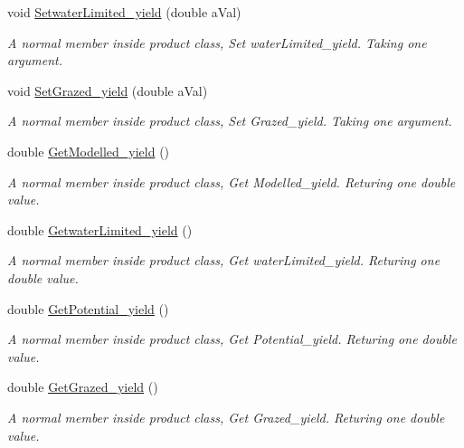 \begin{DoxyCompactItemize}
void \mbox{\hyperlink{class_global_vars_1_1product_ab53d704f6a5d1b59bc932fc5a405419c}{Setwater\+Limited\+\_\+yield}} (double a\+Val)
\begin{DoxyCompactList}\small\item\em A normal member inside product class, Set water\+Limited\+\_\+yield. Taking one argument. \end{DoxyCompactList}\item 
void \mbox{\hyperlink{class_global_vars_1_1product_a1abfaf513605e36d1b477e91534f7657}{Set\+Grazed\+\_\+yield}} (double a\+Val)
\begin{DoxyCompactList}\small\item\em A normal member inside product class, Set Grazed\+\_\+yield. Taking one argument. \end{DoxyCompactList}\item 
double \mbox{\hyperlink{class_global_vars_1_1product_a03a183a7d8aaf4c69ebb1da4b6519ce2}{Get\+Modelled\+\_\+yield}} ()
\begin{DoxyCompactList}\small\item\em A normal member inside product class, Get Modelled\+\_\+yield. Returing one double value. \end{DoxyCompactList}\item 
double \mbox{\hyperlink{class_global_vars_1_1product_afc503db364ad2560853f82273ff428f5}{Getwater\+Limited\+\_\+yield}} ()
\begin{DoxyCompactList}\small\item\em A normal member inside product class, Get water\+Limited\+\_\+yield. Returing one double value. \end{DoxyCompactList}\item 
double \mbox{\hyperlink{class_global_vars_1_1product_af36d802050e8d54552fe27e50c23fdf2}{Get\+Potential\+\_\+yield}} ()
\begin{DoxyCompactList}\small\item\em A normal member inside product class, Get Potential\+\_\+yield. Returing one double value. \end{DoxyCompactList}\item 
double \mbox{\hyperlink{class_global_vars_1_1product_affc6ccd9056f2c8d6bef17dc145e8e8a}{Get\+Grazed\+\_\+yield}} ()
\begin{DoxyCompactList}\small\item\em A normal member inside product class, Get Grazed\+\_\+yield. Returing one double value. \end{DoxyCompactList}\item 

\end{DoxyCompactItemize}
